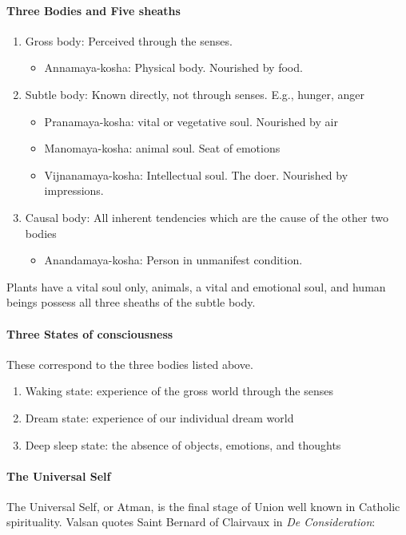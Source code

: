 \paragraph{Three Bodies and Five sheaths}
\begin{enumerate}
\item Gross body: Perceived through the senses. 

\begin{itemize}
\item Annamaya-kosha: Physical body. Nourished by food. 
\end{itemize}
\item Subtle body: Known directly, not through senses. E.g., hunger, anger 

\begin{itemize}
\item Pranamaya-kosha: vital or vegetative soul. Nourished by air 
\item Manomaya-kosha: animal soul. Seat of emotions 
\item Vijnanamaya-kosha: Intellectual soul. The doer. Nourished by impressions. 
\end{itemize}
\item Causal body: All inherent tendencies which are the cause of the other two bodies 

\begin{itemize}
\item Anandamaya-kosha: Person in unmanifest condition. 
\end{itemize}
\end{enumerate}
Plants have a vital soul only, animals, a vital and emotional soul, and human beings possess all three sheaths of the subtle body.

\paragraph{Three States of consciousness}
These correspond to the three bodies listed above.

\begin{enumerate}
\item Waking state: experience of the gross world through the senses 
\item Dream state: experience of our individual dream world 
\item Deep sleep state: the absence of objects, emotions, and thoughts 
\end{enumerate}
\paragraph{The Universal Self}
The Universal Self, or Atman, is the final stage of Union well known in Catholic spirituality. Valsan quotes Saint Bernard of Clairvaux in \emph{De Consideration}:

